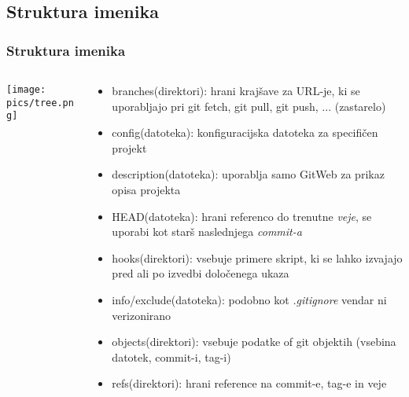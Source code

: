 \documentclass{beamer}
\begin{document}
\subsection{Struktura imenika}
\begin{frame}[shrink=28]
  \frametitle{Struktura imenika}
  \begin{columns}[T]
    \begin{column}{.5\textwidth}
      \texttt{[image: pics/tree.png]}
    \end{column}
    \begin{column}{.5\textwidth}
      \begin{itemize}
        \item branches(direktori): hrani krajšave za URL-je, ki se uporabljajo
          pri git fetch, git pull, git push, ... (zastarelo)
        \item config(datoteka): konfiguracijska datoteka za specifičen projekt
        \item description(datoteka): uporablja samo GitWeb za prikaz opisa projekta
        \item HEAD(datoteka): hrani referenco do trenutne \emph{veje}, se
          uporabi kot starš naslednjega \emph{commit-a}
        \item hooks(direktori): vsebuje primere skript, ki se lahko izvajajo
          pred ali po izvedbi določenega ukaza
        \item info/exclude(datoteka): podobno kot \emph{.gitignore} vendar ni verizonirano
        \item objects(direktori): vsebuje podatke of git objektih (vsebina
          datotek, commit-i, tag-i)
        \item refs(direktori): hrani reference na commit-e, tag-e in veje
      \end{itemize}
    \end{column}
  \end{columns}
\end{frame}
\end{document}
